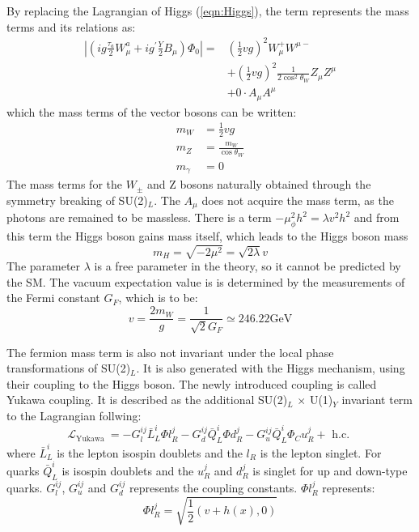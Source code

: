 By replacing the Lagrangian of Higgs (\ref{eqn:Higgs}), the term represents the mass terms and its relations as:
\begin{equation}
\begin{aligned}
\left|\left(i g \frac{\tau_{a}}{2} W_{\mu}^{a}+i g^{\prime} \frac{Y}{2} B_{\mu}\right) \Phi_{0}\right|=&\left(\frac{1}{2} v g\right)^{2} W_{\mu}^{+} W^{\mu-} \\
&+\left(\frac{1}{2} v g\right)^{2} \frac{1}{2 \cos ^{2} \theta_{W}} Z_{\mu} Z^{\mu} \\
&+0 \cdot A_{\mu} A^{\mu}
\end{aligned}
\end{equation}
which the mass terms of the vector bosons can be written:
\begin{equation}
\begin{aligned}
m_{W}&=\frac{1}{2} vg \\
m_{Z}&=\frac{m_{W}}{\cos \theta_{W}} \\
m_{\gamma}&=0
\end{aligned}
\end{equation}
The mass terms for the $W_\pm$ and Z bosons naturally obtained through the symmetry breaking of SU(2)$_L$. 
The $A_\mu$ does not acquire the mass term, as the photons are remained to be massless.
There is a term $-\mu_{\phi}^{2} h^{2}=\lambda v^{2} h^{2}$ and from this term the Higgs boson gains mass itself, which leads to the Higgs boson mass 
\begin{equation}
m_{H}=\sqrt{-2 \mu^{2}}=\sqrt{2 \lambda} v
\end{equation}
The parameter $\lambda$ is a free parameter in the theory, so it cannot be predicted by the SM.
The vacuum expectation value is is determined by the measurements of the Fermi constant $G_F$, which is to be:
\begin{equation}
v=\frac{2 m_{W}}{g}=\frac{1}{\sqrt{2} G_{F}} \simeq 246.22 \mathrm{GeV}
\end{equation}

The fermion mass term is also not invariant under the local phase transformations of SU(2)$_L$. It is also generated with the Higgs mechanism, using their coupling to the Higgs boson. The newly introduced coupling is called Yukawa coupling.
It is described as the additional SU(2)$_L$ $\times$ U(1)$_Y$ invariant term to the Lagrangian follwing:
\begin{equation}
\mathcal{L}_{\text {Yukawa }}=-G_{l}^{i j} \bar{L}_{L}^{i} \Phi l_{R}^{j}-G_{d}^{i j} \bar{Q}_{L}^{i} \Phi d_{R}^{j}-G_{u}^{i j} \bar{Q}_{L}^{i} \Phi_{C} u_{R}^{j}+\text { h.c. }
\end{equation}
where $\bar{L}_{L}^{i}$ is the lepton isospin doublets and the $l_{R}$ is the lepton singlet. For quarks $\bar{Q}_{L}^{i}$ is isospin doublets and the $ u_{R}^{j}$ and $d_{R}^{j}$ is singlet for up and down-type quarks. $G_{l}^{i j}$, $G_{u}^{i j}$ and $G_{d}^{i j}$ represents the coupling constants. $\Phi l_{R}^{j}$ represents:
\begin{equation}
\Phi l_{R}^{j} = \sqrt{\frac{1}{2}(v+h(x),0)}
\end{equation}

